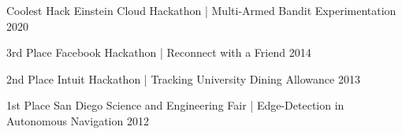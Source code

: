 

\begin{cvhonors}
  \cvhonor
    {Coolest Hack}
    {Einstein Cloud Hackathon | Multi-Armed Bandit Experimentation}
    {2020}

  \cvhonor
    {3rd Place}
    {Facebook Hackathon | Reconnect with a Friend}
    {2014}

  \cvhonor
    {2nd Place}
    {Intuit Hackathon | Tracking University Dining Allowance}
    {2013}

  \cvhonor
    {1st Place}
    {San Diego Science and Engineering Fair | Edge-Detection in Autonomous Navigation}
    {2012}
\end{cvhonors}
